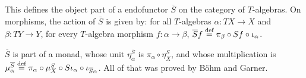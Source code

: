 \documentclass[preprint,12pt]{elsarticle}
\newcommand\eqdef{\mathrel{\buildrel \text{def}\over=}}
\newcommand\Smyth{{\mathcal Q}}
\newcommand\Vt{\mathsf{V}}
\newcommand\SV{\Smyth_{\Vt}}
\newcommand\Val{{\mathbf V}}
\begin{document}
This defines the object part of a endofunctor $\overline S$ on the
category of $T$-algebras.
On morphisms, the action of $\overline S$ is given by: for all
$T$-algebras $\alpha \colon TX \to X$ and $\beta \colon TY \to Y$, for
every $T$-algebra morphism $f \colon \alpha \to \beta$,
$\overline S f \eqdef \pi_\beta \circ S f \circ \iota_\alpha$.

$\overline S$ is part of a monad, whose unit
$\eta^{\overline S}_\alpha$ is $\pi_\alpha \circ \eta^S_X$, and whose
multiplication is
$\mu^{\overline S}_\alpha \eqdef \pi_\alpha \circ \mu^S_X \circ S
\iota_\alpha \circ \iota_{\overline S \alpha}$.  All of that was
proved by B\"ohm and Garner.
\end{document}
